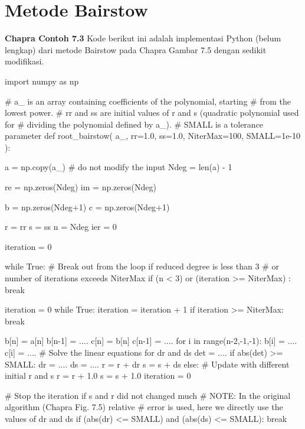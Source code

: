 \section{Metode Bairstow}

\textbf{Chapra Contoh 7.3}
Kode berikut ini adalah implementasi Python (belum lengkap)
dari metode Bairstow pada Chapra Gambar 7.5 dengan sedikit modifikasi.

\begin{pythoncode}
import numpy as np

# a_ is an array containing coefficients of the polynomial, starting
# from the lowest power.
# rr and ss are initial values of r and s (quadratic polynomial used for
# dividing the polynomial defined by a_).
# SMALL is a tolerance parameter
def root_bairstow( a_, rr=1.0, ss=1.0, NiterMax=100, SMALL=1e-10 ):
    
    a = np.copy(a_) # do not modify the input
    Ndeg = len(a) - 1
    
    re = np.zeros(Ndeg)
    im = np.zeros(Ndeg)
    
    b = np.zeros(Ndeg+1)
    c = np.zeros(Ndeg+1)
    
    r = rr
    s = ss
    n = Ndeg
    ier = 0
    
    iteration = 0
    
    while True:
        # Break out from the loop if reduced degree is less than 3
        # or number of iterations exceeds NiterMax    
        if (n < 3) or (iteration >= NiterMax) :
            break
    
        iteration = 0
        while True:
            iteration = iteration + 1
            if iteration >= NiterMax:
                break
            
            b[n]   = a[n]
            b[n-1] = ....
            c[n]   = b[n]
            c[n-1] = ....
            for i in range(n-2,-1,-1):
                b[i] = ....
                c[i] = ....
            # Solve the linear equations for dr and ds
            det = ....
            if abs(det) >= SMALL:
                dr = ....
                ds = ....
                r = r + dr
                s = s + ds
            else:
                # Update with different initial r and s
                r = r + 1.0
                s = s + 1.0
                iteration = 0
            
            # Stop the iteration if s and r did not changed much
            # NOTE: In the original algorithm (Chapra Fig. 7.5) relative
            # error is used, here we directly use the values of dr and ds
            if (abs(dr) <= SMALL) and (abs(ds) <= SMALL):
                break
        

\end{pythoncode}
